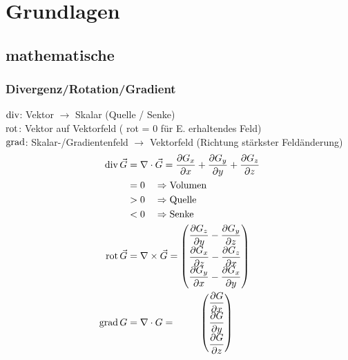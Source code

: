 \section{Grundlagen}
\subsection{mathematische}
\subsubsection*{Divergenz/Rotation/Gradient}

$\operatorname{div}$: Vektor $\rightarrow$ Skalar (Quelle / Senke)\\
$\operatorname{rot}$: Vektor auf Vektorfeld ( rot = 0 für E. erhaltendes Feld)\\
$\operatorname{grad}$: Skalar-/Gradientenfeld $\rightarrow$ Vektorfeld (Richtung stärkster Feldänderung)
\begin{align*}
    \operatorname{div} \vec{G} & = \nabla \cdot \vec{G} = \dfrac{\partial G_x}{\partial x} + \dfrac{\partial G_y}{\partial y} + \dfrac{\partial G_z}{\partial z} \\
                   & = 0 \quad\Rightarrow \textnormal{Volumen}                                                                                       \\
                   & > 0 \quad\Rightarrow \textnormal{Quelle}                                                                                        \\
                   & < 0 \quad\Rightarrow \textnormal{Senke}                                                                                         \\
    \operatorname{rot} \vec{G} & = \nabla \times \vec{G} =
    \begin{pmatrix}
        \dfrac{\partial G_z}{\partial y} - \dfrac{\partial G_y}{\partial z} \\
        \dfrac{\partial G_x}{\partial z} - \dfrac{\partial G_z}{\partial x} \\
        \dfrac{\partial G_y}{\partial x} - \dfrac{\partial G_x}{\partial y}
    \end{pmatrix}                                                                              \\
    \operatorname{grad} G      & = \nabla \cdot G = \hspace{6ex}
    \begin{pmatrix}
        \dfrac{\partial G}{\partial x} \\
        \dfrac{\partial G}{\partial y} \\
        \dfrac{\partial G}{\partial z}
    \end{pmatrix}
\end{align*}


